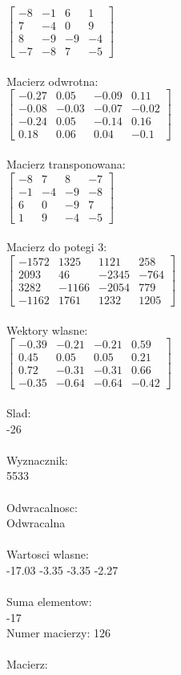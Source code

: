 \documentclass[a4paper,12pt]{article}
\begin{document}
$\begin{bmatrix} -8&-1&6&1\\7&-4&0&9\\8&-9&-9&-4\\-7&-8&7&-5 \end{bmatrix}$
\\
\\
Macierz odwrotna:\\

$\begin{bmatrix} -0.27&0.05&-0.09&0.11\\-0.08&-0.03&-0.07&-0.02\\-0.24&0.05&-0.14&0.16\\0.18&0.06&0.04&-0.1 \end{bmatrix}$
\\
\\
Macierz transponowana:\\

$\begin{bmatrix} -8&7&8&-7\\-1&-4&-9&-8\\6&0&-9&7\\1&9&-4&-5 \end{bmatrix}$
\\
\\
Macierz do potegi 3:\\

$\begin{bmatrix} -1572&1325&1121&258\\2093&46&-2345&-764\\3282&-1166&-2054&779\\-1162&1761&1232&1205 \end{bmatrix}$
\\
\\
Wektory wlasne:\\

$\begin{bmatrix} -0.39&-0.21&-0.21&0.59\\0.45&0.05&0.05&0.21\\0.72&-0.31&-0.31&0.66\\-0.35&-0.64&-0.64&-0.42 \end{bmatrix}$
\\
\\
Slad:\\
-26
\\
\\
Wyznacznik:\\
5533
\\
\\
Odwracalnosc:\\
Odwracalna
\\
\\
Wartosci wlasne:\\
-17.03 -3.35 -3.35 -2.27
\\
\\
Suma elementow:\\
-17
\\
\newpage
Numer macierzy:
126
\\
\\
Macierz:\\
\end{document}
